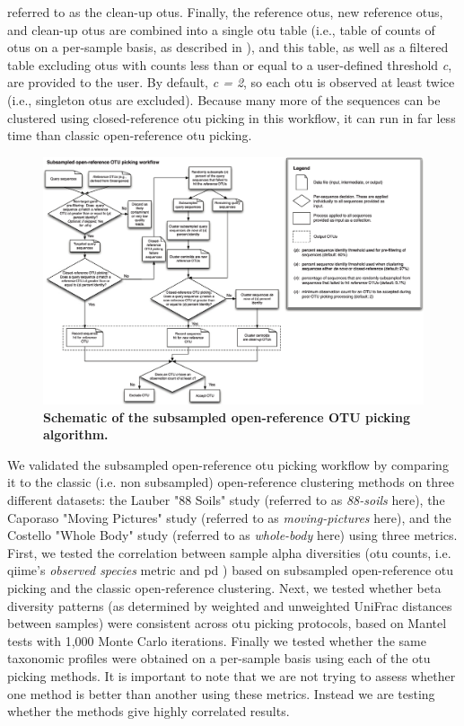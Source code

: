 referred to as the clean-up \gls{otu}s. Finally, the reference \gls{otu}s, new
reference \gls{otu}s, and clean-up \gls{otu}s are combined into a single \gls{otu}
table (i.e., table of counts of \gls{otu}s on a per-sample basis, as described in
\cite{McDonald2012BIOM}), and this table, as well as a filtered table excluding
\gls{otu}s with counts less than or equal to a user-defined threshold \emph{c},
are provided to the user. By default, \emph{c = 2}, so each \gls{otu} is
observed at least twice (i.e., singleton \gls{otu}s are excluded). Because
many more of the sequences can be clustered using closed-reference \gls{otu}
picking in this workflow, it can run in far less time than classic
open-reference \gls{otu} picking.

\begin{figure}[htbp]
\includegraphics[width=\columnwidth]{chapter_otupicking_figures/workflow.png}
\caption[Schematic of the subsampled open-reference OTU picking algorithm]{\textbf{Schematic of the subsampled open-reference OTU picking algorithm.}}
\label{sub_open_ref_fig1}
\end{figure}

We validated the subsampled open-reference \gls{otu} picking workflow by comparing it
to the classic (i.e. non subsampled) open-reference clustering methods on three
different datasets: the Lauber "88 Soils" study \cite{Lauber2009} (referred to
as \emph{88-soils} here), the Caporaso "Moving Pictures" study \cite{Caporaso2011}
(referred to as \emph{moving-pictures} here), and the Costello "Whole Body" study
\cite{Costello2009} (referred to as \emph{whole-body} here) using three metrics.
First, we tested the correlation between sample alpha diversities (\gls{otu} counts,
i.e. \gls{qiime}'s \emph{observed species} metric and \gls{pd} \cite{Faith1992}) based
on subsampled open-reference \gls{otu} picking and the classic open-reference clustering.
Next, we tested whether beta diversity patterns (as determined by weighted and
unweighted UniFrac \cite{Lozupone2005} distances between samples) were consistent across \gls{otu}
picking protocols, based on Mantel tests \cite{Mantel1967} with 1,000 Monte Carlo iterations.
Finally we tested whether the same taxonomic profiles were obtained on a per-sample
basis using each of the \gls{otu} picking methods. It is important to note that
we are not trying to assess whether one method is better than another using these metrics.
Instead we are testing whether the methods give highly correlated results.

